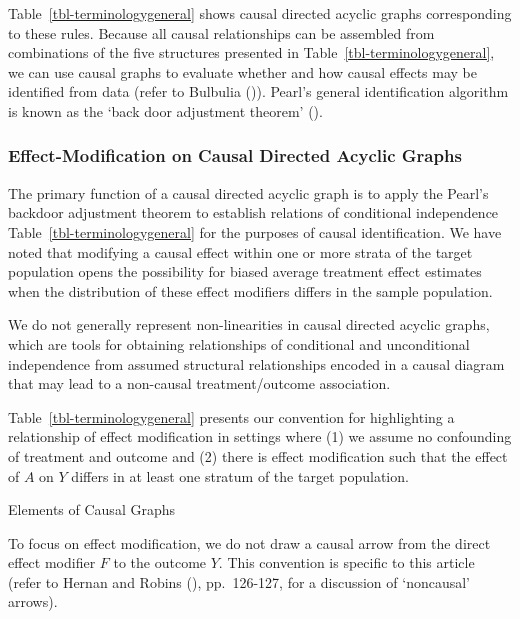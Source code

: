 \documentclass[
  single column]{article}
\begin{document}
Table~\ref{tbl-terminologygeneral} shows causal directed acyclic graphs
corresponding to these rules. Because all causal relationships can be
assembled from combinations of the five structures presented in
Table~\ref{tbl-terminologygeneral}, we can use causal graphs to evaluate
whether and how causal effects may be identified from data (refer to
Bulbulia ()). Pearl's general
identification algorithm is known as the `back door adjustment theorem'
().

\subsubsection{Effect-Modification on Causal Directed Acyclic
Graphs}\label{effect-modification-on-causal-directed-acyclic-graphs}

The primary function of a causal directed acyclic graph is to apply the
Pearl's backdoor adjustment theorem to establish relations of
conditional independence Table~\ref{tbl-terminologygeneral} for the
purposes of causal identification. We have noted that modifying a causal
effect within one or more strata of the target population opens the
possibility for biased average treatment effect estimates when the
distribution of these effect modifiers differs in the sample population.

We do not generally represent non-linearities in causal directed acyclic
graphs, which are tools for obtaining relationships of conditional and
unconditional independence from assumed structural relationships encoded
in a causal diagram that may lead to a non-causal treatment/outcome
association.

Table~\ref{tbl-terminologygeneral} presents our convention for
highlighting a relationship of effect modification in settings where (1)
we assume no confounding of treatment and outcome and (2) there is
effect modification such that the effect of \(A\) on \(Y\) differs in at
least one stratum of the target population.

\begin{table}

\caption{\label{tbl-terminologygeneral}Elements of Causal Graphs}

\centering{

\terminologyeffectmodification

}

\end{table}%

To focus on effect modification, we do not draw a causal arrow from the
direct effect modifier \(F\) to the outcome \(Y\). This convention is
specific to this article (refer to Hernan and Robins
(), pp.~126-127, for a discussion
of `noncausal' arrows).
\end{document}

